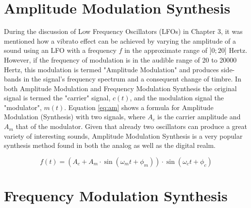 \documentclass[12pt,twoside]{report}
\begin{document}
\section{Amplitude Modulation Synthesis}

During the discussion of Low Frequency Oscillators (LFOs) in Chapter 3, it was mentioned how a vibrato effect can be achieved by varying the amplitude of a sound using an LFO with a frequency $f$ in the approximate range of $]0;20]$ Hertz. However, if the frequency of modulation is in the audible range of 20 to 20000 Hertz, this modulation is termed "Amplitude Modulation" and produces side-bands in the signal's frequency spectrum and a consequent change of timbre. In both Amplitude Modulation and Frequency Modulation Synthesis the original signal is termed the "carrier" signal, $c(t)$, and the modulation signal the "modulator", $m(t)$. Equation \ref{eq:am} shows a formula for Amplitude Modulation (Synthesis) with two signals, where $A_{c}$ is the carrier amplitude and $A_{m}$ that of the modulator. Given that already two oscillators can produce a great variety of interesting sounds, Amplitude Modulation Synthesis is a very popular synthesis method found in both the analog as well as the digital realm.

\begin{equation}
  f(t) = (A_{c} + A_{m}\cdot\sin(\omega_{m} t + \phi_{m}))\cdot\sin(\omega_{c} t + \phi_{c})
  \label{eq:am}
\end{equation}

\section{Frequency Modulation Synthesis}
\end{document}
